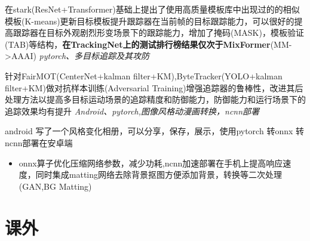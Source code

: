 \documentclass{uniquecv}
\begin{document}
在stark(ResNet+Transformer)基础上提出了使用高质量模板库中出现过的的相似模板(K-means)更新目标模板提升跟踪器在当前帧的目标跟踪能力，可以很好的提高跟踪器在目标外观剧烈形变场景下的跟踪能力，增加了掩码(MASK)，模板验证(TAB)等结构，\textbf{在TrackingNet上的测试排行榜结果仅次于MixFormer}(MM->AAAI)
\textit{pytorch、多目标追踪及其攻防}
\vspace{0.4ex}

针对FairMOT(CenterNet+kalman filter+KM),ByteTracker(YOLO+kalman filter+KM)做对抗样本训练(Adversarial Training)增强追踪器的鲁棒性，改进其后处理方法以提高多目标运动场景的追踪精度和防御能力，防御能力和运行场景下的追踪效果均有提升
\textit{Android、pytorch,图像风格动漫画转换，ncnn部署}
\vspace{0.4ex}

android 写了一个风格变化相册，可以分享，保存，展示，使用pytorch 转onnx 转 ncnn部署在安卓端
\begin{itemize}
  \item onnx算子优化压缩网络参数，减少功耗,ncnn加速部署在手机上提高响应速度，同时集成matting网络去除背景抠图方便添加背景，转换等二次处理(GAN,BG Matting)
\end{itemize}
\section{课外}
\end{document}
